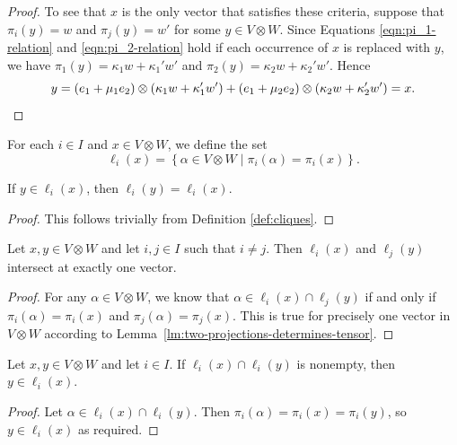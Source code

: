 \begin{proof}
To see that $x$ is the only vector that satisfies these criteria, suppose that $\pi_i{\left(y \right)} = w$ and $\pi_j{\left(y \right)} = w'$ for some $y \in V \otimes W$. Since Equations \eqref{eqn:pi_1-relation} and \eqref{eqn:pi_2-relation} hold if each occurrence of $x$ is replaced with $y$, we have $\pi_1{\left(y \right)} = \kappa_1 w + \kappa_1' w'$ and $\pi_2{\left(y \right)} = \kappa_2 w + \kappa_2' w'$. Hence
\begin{displaymath}
    y = \left(e_1 + \mu_1 e_2 \right) \otimes \left(\kappa_1 w + \kappa_1' w' \right) + \left(e_1 + \mu_2 e_2 \right) \otimes \left(\kappa_2 w + \kappa_2' w' \right) = x.\qedhere
\end{displaymath}
\end{proof}

\begin{defi} \label{def:cliques}
For each $i \in I$ and $x \in V \otimes W$, we define the set
\begin{displaymath}
    \ell_i{\left(x \right)} = {\left\{\alpha \in V \otimes W \mid \pi_i{\left(\alpha \right)} = \pi_i{\left(x \right)}\right\}}.
\end{displaymath}
\end{defi}

\begin{lemma} \label{lm:clique-equivalence}
If $y \in \ell_i{\left(x \right)}$, then $\ell_i{\left(y \right)} = \ell_i{\left(x \right)}$.
\end{lemma}
\begin{proof}
This follows trivially from Definition \ref{def:cliques}.
\end{proof}

\begin{lemma} \label{lm:clique-intersection}
Let $x, y \in V \otimes W$ and let $i, j \in I$ such that $i \neq j$. Then $\ell_i{\left(x \right)}$ and $\ell_j{\left(y \right)}$ intersect at exactly one vector.
\end{lemma}
\begin{proof}
For any $\alpha \in V \otimes W$, we know that $\alpha \in \ell_i{\left(x \right)} \cap \ell_j{\left(y \right)}$ if and only if $\pi_i{\left(\alpha \right)} = \pi_i{\left(x \right)}$ and $\pi_j{\left(\alpha \right)} = \pi_j{\left(x \right)}$. This is true for precisely one vector in $V \otimes W$ according to Lemma~\ref{lm:two-projections-determines-tensor}.
\end{proof}

\begin{lemma} \label{lm:parallel-cliques}
Let $x, y \in V \otimes W$ and let $i \in I$. If $\ell_i{\left(x \right)} \cap \ell_i{\left(y \right)}$ is nonempty, then $y \in \ell_i{\left(x \right)}$.
\end{lemma}
\begin{proof}
Let $\alpha \in \ell_i{\left(x \right)} \cap \ell_i{\left(y \right)}$. Then $\pi_i{\left(\alpha \right)} = \pi_i{\left(x \right)} = \pi_i{\left(y \right)}$, so $y \in \ell_i{\left(x \right)}$ as required.
\end{proof}

